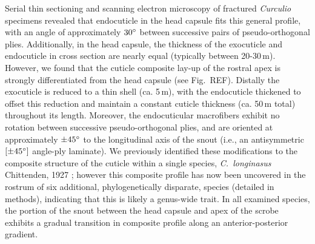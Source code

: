\documentclass[twocolumn, linenumbers, superscriptaddress, nofootinbib]{revtex4-1}
\begin{document}
		Serial thin sectioning and scanning electron microscopy of fractured \textit{Curculio} specimens revealed that endocuticle in the head capsule fits this general profile, with an angle of approximately $30\degree$ between successive pairs of pseudo-orthogonal plies.
		Additionally, in the head capsule, the thickness of the exocuticle and endocuticle in cross section are nearly equal (typically between 20-30\,{\textmu}m).
		However, we found that the cuticle composite lay-up of the rostral apex is strongly differentiated from the head capsule (see Fig.~REF).
		Distally the exocuticle is reduced to a thin shell (ca. 5\,{\textmu}m), with the endocuticle thickened to offset this reduction and maintain a constant cuticle thickness (ca. 50\,{\textmu}m total) throughout its length.
		Moreover, the endocuticular macrofibers exhibit no rotation between successive pseudo-orthogonal plies, and are oriented at approximately $\pm45\degree$ to the longitudinal axis of the snout (i.e., an antisymmetric $[\pm45\degree]$ angle-ply laminate).
		We previously identified these modifications to the composite structure of the cuticle within a single species, \textit{C.~longinasus} Chittenden, 1927 \cite{Jansen2016, Singh2016}; however this composite profile has now been uncovered in the rostrum of six additional, phylogenetically disparate, species (detailed in methods), indicating that this is likely a genus-wide trait.
		In all examined species, the portion of the snout between the head capsule and apex of the scrobe exhibits a gradual transition in composite profile along an anterior-posterior gradient.
		
\end{document}
